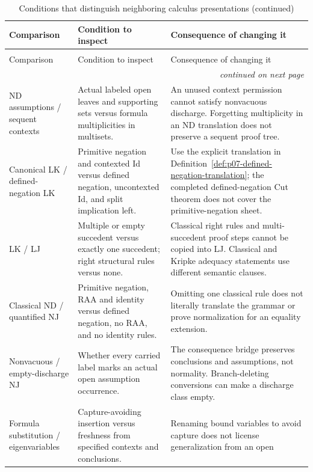 \begingroup\small
\begin{longtable}{@{}p{}p{}p{}@{}}
\caption{Conditions that distinguish neighboring calculus presentations.}
\label{tab:p14-classical-calculi-side-conditions}\\
\toprule
Comparison & Condition to inspect & Consequence of changing it \\
\midrule
\endfirsthead
\caption[]{Conditions that distinguish neighboring calculus presentations (continued)}\\
\toprule
Comparison & Condition to inspect & Consequence of changing it \\
\midrule
\endhead
\midrule\multicolumn{3}{r}{\emph{continued on next page}}\\
\endfoot
\endlastfoot
ND assumptions / sequent contexts & Actual labeled open leaves and
supporting sets versus formula multiplicities in multisets. & An unused
context permission cannot satisfy nonvacuous discharge.  Forgetting
multiplicity in an ND translation does not preserve a sequent proof tree. \\
Canonical LK / defined-negation LK & Primitive negation and contexted Id
versus defined negation, uncontexted Id, and split implication left. &
Use the explicit translation in
Definition~\ref{def:p07-defined-negation-translation}; the completed
defined-negation Cut theorem does not cover the primitive-negation sheet. \\
LK / LJ & Multiple or empty succedent versus exactly one succedent;
right structural rules versus none. & Classical right rules and
multi-succedent proof steps cannot be copied into LJ.  Classical and Kripke
adequacy statements use different semantic clauses. \\
Classical ND / quantified NJ & Primitive negation, RAA and identity versus
defined negation, no RAA, and no identity rules. & Omitting one classical
rule does not literally translate the grammar or prove normalization
for an equality extension. \\
Nonvacuous / empty-discharge NJ & Whether every carried label marks an
actual open assumption occurrence. & The consequence bridge preserves
conclusions and assumptions, not normality.  Branch-deleting conversions
can make a discharge class empty. \\
Formula substitution / eigenvariables & Capture-avoiding insertion versus
freshness from specified contexts and conclusions. & Renaming bound
variables to avoid capture does not license generalization from an open

\end{longtable}
